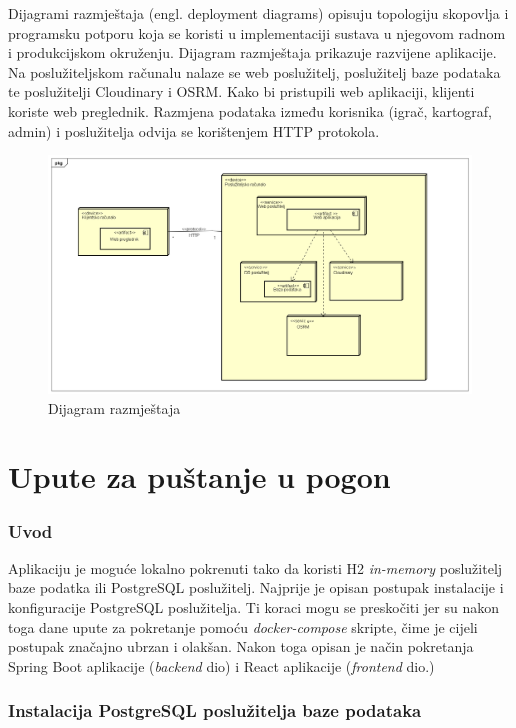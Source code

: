 			{Dijagrami razmještaja (engl. deployment diagrams) opisuju topologiju skopovlja i programsku potporu koja se koristi u implementaciji sustava u njegovom radnom i produkcijskom okruženju. Dijagram razmještaja prikazuje razvijene aplikacije. Na poslužiteljskom računalu nalaze se web poslužitelj, poslužitelj baze podataka te poslužitelji Cloudinary i OSRM. Kako bi pristupili web aplikaciji, klijenti koriste web preglednik. Razmjena podataka između korisnika (igrač, kartograf, admin) i poslužitelja odvija se korištenjem HTTP protokola.}
			\begin{figure}[H]
				\includegraphics[width=\textwidth]{dijagrami/dijagram_razmjestaja} 
				\centering
				\caption{Dijagram razmještaja}
				\label{}
			\end{figure}
			\eject 
		
		\section{Upute za puštanje u pogon}
		
			\subsubsection{Uvod}
		
			{Aplikaciju je moguće lokalno pokrenuti tako da koristi H2 \textit{in-memory} poslužitelj baze podatka ili PostgreSQL poslužitelj. Najprije je opisan postupak instalacije i konfiguracije PostgreSQL poslužitelja. Ti koraci mogu se preskočiti jer su nakon toga dane upute za pokretanje pomoću \textit{docker-compose} skripte, čime je cijeli postupak značajno ubrzan i olakšan. Nakon toga opisan je način pokretanja Spring Boot aplikacije (\textit{backend} dio) i React aplikacije (\textit{frontend} dio.)}
			
			\subsubsection{Instalacija PostgreSQL poslužitelja baze podataka}
		
